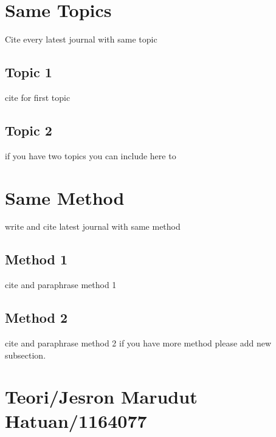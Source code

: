 \section{Same Topics}
Cite every latest journal with same topic
\subsection{Topic 1}
cite for first topic

\subsection{Topic 2}
if you have two topics you can include here to


\section{Same Method}
write and cite latest journal with same method

\subsection{Method 1}
cite and paraphrase method 1

\subsection{Method 2}
cite and paraphrase method 2 if you have more method please add new subsection.

\section{Teori/Jesron Marudut Hatuan/1164077}
